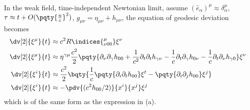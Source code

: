 \documentclass[12pt]{article}
\begin{document}
        \subsubsection{} In the weak field, time-independent Newtonian limit, assume \((\hat{e}_\alpha)^\mu \approx \delta_{\alpha}^\mu\), \(\tau \approx t + O(\pqty{\frac{u}{c}}^2)\), \(g_{\mu\nu} = \eta_{\mu\nu} + h_{\mu\nu}\), the equation of geodesic deviation becomes \begin{align*}
            \dv[2]{\xi^\mu}{t} &\approx  c^2 R\indices{_{\nu 00}^\mu} \xi^{\nu}\\
            \dv[2]{\xi^\mu}{t} &\approx  \eta^{\gamma \mu}\frac{c^2}{2} \pqty{\partial_\nu\partial_\gamma h_{00} + \frac{1}{c^2}\partial_ t\partial_t h_{\gamma\nu} - \frac{1}{c}\partial_t\partial_\gamma h_{0\nu} - \frac{1}{c}\partial_t \partial_\nu h_{\gamma 0}} \xi^{\nu}\\
            \dv[2]{\xi^i}{t} &\approx \frac{c^2}{2}\bqty{\frac{1}{c}\pqty{\partial_i\partial_t h_{00}}\xi^{t} -\pqty{\partial_i\partial_j h_{00}}\xi^{j} }\\
            \dv[2]{\xi^i}{t} &\approx - \pdv{(c^2h_{00}  /2)}{x^i}{x^j} \xi^{j}
        \end{align*}
        which is of the same form as the expression in (a).
        \newpage
        \section{}
\end{document}
